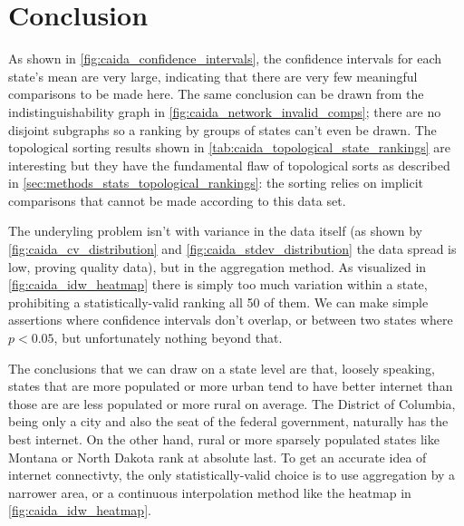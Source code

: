 \section{Conclusion}

As shown in \cref{fig:caida_confidence_intervals}, the confidence intervals for each state's mean are very large, indicating that there are very few meaningful comparisons to be made here. The same conclusion can be drawn from the indistinguishability graph in \cref{fig:caida_network_invalid_comps}; there are no disjoint subgraphs so a ranking by groups of states can't even be drawn. The topological sorting results shown in \cref{tab:caida_topological_state_rankings} are interesting but they have the fundamental flaw of topological sorts as described in \cref{sec:methods_stats_topological_rankings}: the sorting relies on implicit comparisons that cannot be made according to this data set.

The underyling problem isn't with variance in the data itself (as shown by \cref{fig:caida_cv_distribution} and \cref{fig:caida_stdev_distribution} the data spread is low, proving quality data), but in the aggregation method. As visualized in \cref{fig:caida_idw_heatmap} there is simply too much variation within a state, prohibiting a statistically-valid ranking all 50 of them. We can make simple assertions where confidence intervals don't overlap, or between two states where $p<0.05$, but unfortunately nothing beyond that.

The conclusions that we can draw on a state level are that, loosely speaking, states that are more populated or more urban tend to have better internet than those are are less populated or more rural on average. The District of Columbia, being only a city and also the seat of the \us federal government, naturally has the best internet. On the other hand, rural or more sparsely populated states like Montana or North Dakota rank at absolute last. To get an accurate idea of internet connectivty, the only statistically-valid choice is to use aggregation by a narrower area, or a continuous interpolation method like the \idw heatmap in \cref{fig:caida_idw_heatmap}.
